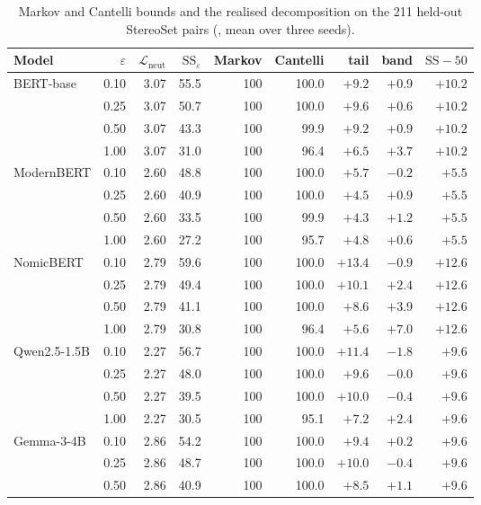\begin{table}[h]
  \centering
  \caption{Markov and Cantelli bounds and the realised decomposition on the 211 held-out StereoSet pairs (\PEAT{}, mean over three seeds).}
  \label{sup:tab:bounds}
  \footnotesize\setlength{\tabcolsep}{4pt}
  \begin{tabular}{@{}lrrrrrrrr@{}}
    \toprule
    Model & $\varepsilon$ & $\mathcal{L}_{\mathrm{neut}}$ & $\mathrm{SS}_\varepsilon$ & Markov & Cantelli & tail & band & $\mathrm{SS}-50$ \\
    \midrule
    BERT-base & 0.10 & 3.07 & 55.5 & 100 & 100.0 & $+9.2$ & $+0.9$ & $+10.2$ \\
     & 0.25 & 3.07 & 50.7 & 100 & 100.0 & $+9.6$ & $+0.6$ & $+10.2$ \\
     & 0.50 & 3.07 & 43.3 & 100 & 99.9 & $+9.2$ & $+0.9$ & $+10.2$ \\
     & 1.00 & 3.07 & 31.0 & 100 & 96.4 & $+6.5$ & $+3.7$ & $+10.2$ \\
    ModernBERT & 0.10 & 2.60 & 48.8 & 100 & 100.0 & $+5.7$ & $-0.2$ & $+5.5$ \\
     & 0.25 & 2.60 & 40.9 & 100 & 100.0 & $+4.5$ & $+0.9$ & $+5.5$ \\
     & 0.50 & 2.60 & 33.5 & 100 & 99.9 & $+4.3$ & $+1.2$ & $+5.5$ \\
     & 1.00 & 2.60 & 27.2 & 100 & 95.7 & $+4.8$ & $+0.6$ & $+5.5$ \\
    NomicBERT & 0.10 & 2.79 & 59.6 & 100 & 100.0 & $+13.4$ & $-0.9$ & $+12.6$ \\
     & 0.25 & 2.79 & 49.4 & 100 & 100.0 & $+10.1$ & $+2.4$ & $+12.6$ \\
     & 0.50 & 2.79 & 41.1 & 100 & 100.0 & $+8.6$ & $+3.9$ & $+12.6$ \\
     & 1.00 & 2.79 & 30.8 & 100 & 96.4 & $+5.6$ & $+7.0$ & $+12.6$ \\
    Qwen2.5-1.5B & 0.10 & 2.27 & 56.7 & 100 & 100.0 & $+11.4$ & $-1.8$ & $+9.6$ \\
     & 0.25 & 2.27 & 48.0 & 100 & 100.0 & $+9.6$ & $-0.0$ & $+9.6$ \\
     & 0.50 & 2.27 & 39.5 & 100 & 100.0 & $+10.0$ & $-0.4$ & $+9.6$ \\
     & 1.00 & 2.27 & 30.5 & 100 & 95.1 & $+7.2$ & $+2.4$ & $+9.6$ \\
    Gemma-3-4B & 0.10 & 2.86 & 54.2 & 100 & 100.0 & $+9.4$ & $+0.2$ & $+9.6$ \\
     & 0.25 & 2.86 & 48.7 & 100 & 100.0 & $+10.0$ & $-0.4$ & $+9.6$ \\
     & 0.50 & 2.86 & 40.9 & 100 & 100.0 & $+8.5$ & $+1.1$ & $+9.6$ \\

\end{tabular}
\end{table}
